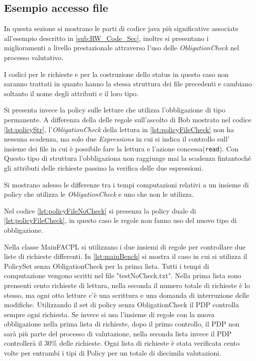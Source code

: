\subsection{Esempio accesso file}
\label{sub:EsAccesJava}
In questa sezione si mostrano le parti di codice java più significative associate all'esempio descritto in \ref{sub:RW_Code_Sec},
inoltre si presentano i miglioramenti a livello prestazionale attraverso l'uso delle \emph{ObligationCheck}
nel processo valutativo.\par
\vspace{2mm}
I codici per le richieste e per la costruzione dello status in questo caso non saranno trattati
in quanto hanno la stessa struttura dei file precedenti e cambiano soltanto il nome degli attributi e il loro tipo.\par
Si presenta invece la policy sulle letture che utilizza l'obbligazione di tipo permanente. A differenza della
delle regole sull'ascolto di Bob mostrato nel codice \ref{lst:policyStr}, l'\emph{ObligationCheck} della lettura in
\ref{lst:policyFileCheck} non ha nessuna scadenza, ma solo due \emph{Expressions} in cui si indica il controllo sull'
insieme dei file in cui è possibile fare la lettura e l'azione concessa(\texttt{read}). Con Questo tipo di struttura
l'obbligaziona non raggiunge mai la scadenza fintantoché gli attributi delle richieste passino la verifica delle due espressioni.

Si mostrano adesso le differenze tra i tempi computazioni relativi a un insieme di policy che utilizza le \emph{ObligationCheck}
e uno che non le utilizza.\par
Nel codice \ref{lst:policyFileNoCheck} si presenza la policy duale di \ref{lst:policyFileCheck},
in questo caso le regole non fanno uso del nuovo tipo di obbligazione.

Nella classe MainFACPL si utilizzano i due insiemi di regole per controllare due liste di richieste differenti.
In \ref{lst:mainBench} si mostra il caso in cui si utilizza il PolicySet senza ObligationCheck per la prima lista.
Tutti i tempi di computazione vengono scritti nel file "testNoCheck.txt".
Nella prima lista sono prensenti cento richieste di lettura, nella seconda il numero totale di richieste è lo stesso,
ma ogni otto letture c'è una scrittura e una domanda di interruzione delle modifiche.
Utilizzando il set di policy senza ObligationCheck il PDP controlla sempre ogni richiesta. Se invece si usa l'insieme di regole
con la nuova obbligazione nella prima lista di richieste, dopo il primo controllo, il PDP non sarà più parte del processo
di valutazione, nella seconda lista invece il PDP controllerà il 30\% delle richieste.
Ogni lista di richieste è stata verificata cento volte per entrambi i tipi di Policy per un totale di diecimila valutazioni.


